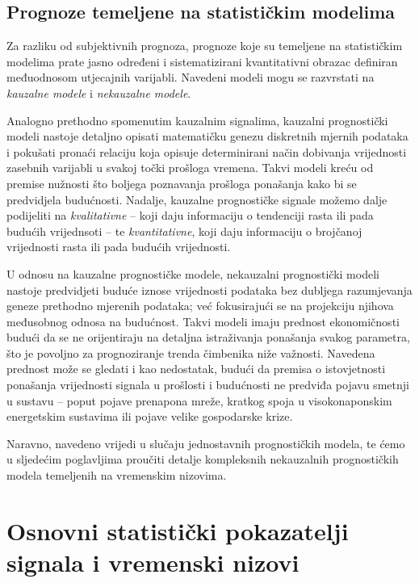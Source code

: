 \documentclass[a4paper,12pt,oneside]{memoir}
\begin{document}
        \section{Prognoze temeljene na statističkim modelima}
            Za razliku od subjektivnih prognoza, prognoze koje su temeljene na statističkim modelima prate jasno određeni i sistematizirani kvantitativni obrazac definiran međuodnosom utjecajnih varijabli. Navedeni modeli mogu se razvrstati na \textit{kauzalne modele} i \textit{nekauzalne modele}.\cite{Holden}
            
            Analogno prethodno spomenutim kauzalnim signalima, kauzalni prognostički modeli nastoje detaljno opisati matematičku genezu diskretnih mjernih podataka i pokušati pronaći relaciju koja opisuje determinirani način dobivanja vrijednosti zasebnih varijabli u svakoj točki prošloga vremena. Takvi modeli kreću od premise nužnosti što boljega poznavanja prošloga ponašanja kako bi se predvidjela budućnosti. Nadalje, kauzalne prognostičke signale možemo dalje podijeliti na \textit{kvalitativne} -- koji daju informaciju o tendenciji rasta ili pada budućih vrijednsoti -- te \textit{kvantitativne}, koji daju informaciju o brojčanoj vrijednosti rasta ili pada budućih vrijednosti.
            
            
            U odnosu na kauzalne prognostičke modele, nekauzalni prognostički modeli nastoje predvidjeti buduće iznose vrijednosti podataka bez dubljega razumjevanja geneze prethodno mjerenih podataka; već fokusirajući se na projekciju njihova međusobnog odnosa na budućnost. Takvi modeli imaju prednost ekonomičnosti budući da se ne orijentiraju na detaljna istraživanja ponašanja svakog parametra, što je povoljno za prognoziranje trenda čimbenika niže važnosti. Navedena prednost može se gledati i kao nedostatak, budući da premisa o istovjetnosti ponašanja vrijednosti signala u prošlosti i budućnosti ne predviđa pojavu smetnji u sustavu -- poput pojave prenapona mreže, kratkog spoja u visokonaponskim energetskim sustavima ili pojave velike gospodarske krize. 
            
            
            Naravno, navedeno vrijedi u slučaju jednostavnih prognostičkih modela, te ćemo u sljedećim poglavljima proučiti detalje kompleksnih nekauzalnih prognostičkih modela temeljenih na vremenskim nizovima.

    \chapter{Osnovni statistički pokazatelji signala i vremenski nizovi}
\end{document}
